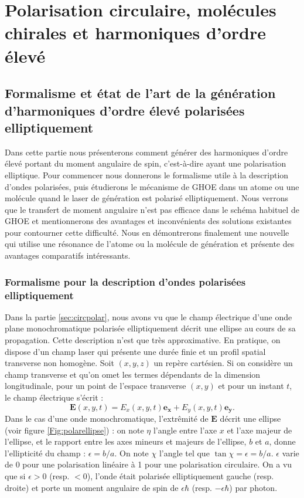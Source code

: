 \part{Polarisation circulaire, molécules chirales et harmoniques d'ordre élevé}
\label{PA:Spin_HHG}
\chapter{Formalisme et état de l'art de la génération d'harmoniques d'ordre élevé polarisées elliptiquement}
Dans cette partie nous présenterons comment générer des harmoniques d'ordre élevé portant du moment angulaire de spin, c'est-à-dire ayant une polarisation elliptique. Pour commencer nous donnerons le formalisme utile à la description d'ondes polarisées, puis étudierons le mécanisme de GHOE dans un atome ou une molécule quand le laser de génération est polarisé elliptiquement. Nous verrons que le transfert de moment angulaire n'est pas efficace dans le schéma habituel de GHOE et mentionnerons des avantages et inconvénients des solutions existantes pour contourner cette difficulté. Nous en démontrerons finalement une nouvelle qui utilise une résonance de l'atome ou la molécule de génération et présente des avantages comparatifs intéressants.

\section{Formalisme pour la description d'ondes polarisées elliptiquement}
\label{sec:polardef}
Dans la partie \ref{sec:circpolar}, nous avons vu que le champ électrique d'une onde plane monochromatique polarisée elliptiquement décrit une ellipse au cours de sa propagation. Cette description n'est que très approximative.
En pratique, on dispose d'un champ laser qui présente une durée finie et un profil spatial transverse non homogène. Soit $(x,y,z)$ un repère cartésien. Si on considère un champ transverse et qu'on omet les termes dépendants de la dimension longitudinale, pour un point de l'espace transverse $(x,y)$ et pour un instant $t$, le champ électrique s'écrit :
\begin{equation}
\bm{E}(x,y,t) = E_x(x,y,t) \bm{e_x} + E_y(x,y,t) \bm{e_y}.
\label{eq:eqstokes1}
\end{equation}
Dans le cas d'une onde monochromatique, l'extrêmité de $\bm{E}$ décrit une ellipse (voir figure \ref{Fig:polarellipse}) : on note $\eta$ l'angle entre l'axe $x$ et l'axe majeur de l'ellipse, et le rapport entre les axes mineurs et majeurs de l'ellipse, $b$ et $a$, donne l'ellipticité du champ : $\epsilon = b/a$. On note $\chi$ l'angle tel que $\tan\chi = \epsilon = b/a$. $\epsilon$ varie de 0 pour une polarisation linéaire à 1 pour une polarisation circulaire.  On a vu que si $\epsilon>0$ (resp. $<0$), l'onde était polarisée elliptiquement gauche (resp. droite) et porte un moment angulaire de spin de $\epsilon\hbar$ (resp. $-\epsilon\hbar$) par photon.

